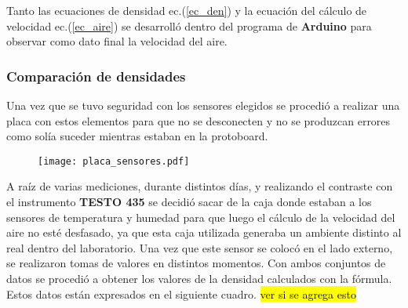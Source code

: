 Tanto las ecuaciones de densidad ec.(\ref{ec_den})
 y la ecuación del cálculo de velocidad  ec.(\ref{ec_aire})
  se desarrolló dentro del programa de \textbf{Arduino} para observar como dato final la velocidad del aire.


\subsubsection{Comparación de densidades} \label{cap:densidades}

Una vez que se tuvo seguridad con los sensores elegidos se procedió a realizar una placa con estos elementos para que no se desconecten y no se produzcan errores como solía suceder mientras estaban en la protoboard. \\
\begin{figure}[htb]
	\centering
	\texttt{[image: placa\_sensores.pdf]}
	\label{fig:sensoresa}
\end{figure}

A raíz de varias mediciones, durante distintos días, y realizando el contraste con el instrumento \textbf{TESTO 435} se decidió sacar de la caja donde estaban a los sensores de temperatura y humedad para que luego el cálculo de la velocidad del aire no esté desfasado, ya que esta caja utilizada generaba un ambiente distinto al real dentro del laboratorio. Una vez que este sensor se colocó en el lado externo, se realizaron tomas de valores en distintos momentos. Con ambos conjuntos de datos se procedió a obtener los valores de la densidad calculados con la fórmula. Estos datos están expresados en el siguiente cuadro. \hl{ver si se agrega esto}


